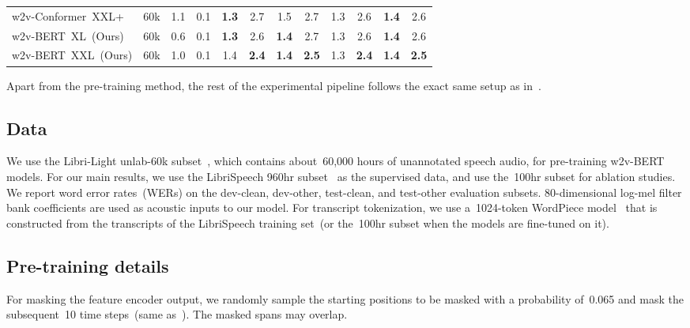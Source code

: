 \documentclass{article}
\begin{document}
\begin{table}[htbp]
{\begin{tabular}{lccccccccccc}
    \quad  w2v-Conformer~XXL+~\cite{zhang2020pushing}
    & 60k & 1.1 & 0.1
    &  \bfseries 1.3 & 2.7  & 1.5  & 2.7 
    &  1.3 &  2.6 & \bfseries 1.4 &  2.6 \\
    \quad  w2v-BERT~XL~(Ours)
    & 60k & 0.6 & 0.1
    &  \bfseries 1.3 & 2.6 & \bfseries 1.4 & 2.7
    &  1.3 & 2.6 & \bfseries 1.4 & 2.6 \\
    \quad  w2v-BERT~XXL~(Ours)
    & 60k & 1.0 & 0.1
    &  1.4 & \bfseries 2.4  & \bfseries 1.4  & \bfseries 2.5 
    &  1.3 & \bfseries 2.4 & \bfseries 1.4 & \bfseries 2.5 \\
    \bottomrule
  \end{tabular}
  }
\end{table}

Apart from the pre-training method, the rest of the experimental pipeline follows the exact same setup as in~\cite{zhang2020pushing}.

\subsection{Data}
We use the Libri-Light unlab-60k subset~\cite{kahn2020libri}, which contains about~60,000 hours of unannotated speech audio, for pre-training w2v-BERT models.
For our main results, we use the LibriSpeech 960hr subset~\cite{panayotov2015librispeech} as the supervised data, and use the~100hr subset for ablation studies.
We report word error rates~(WERs) on the dev-clean, dev-other, test-clean, and test-other evaluation subsets.
80-dimensional log-mel filter bank coefficients are used as acoustic inputs to our model.
For transcript tokenization, we use a~1024-token WordPiece model~\cite{schuster2012japanese} that is constructed from the transcripts of the LibriSpeech training set~(or the~100hr subset when the models are fine-tuned on it).

\subsection{Pre-training details}
 For masking the feature encoder output, we randomly sample the starting positions to be masked with a probability of~0.065 and mask the subsequent~10 time steps~(same as~\cite{baevski2020wav2vec,zhang2020pushing}).
The masked spans may overlap.
\end{document}
